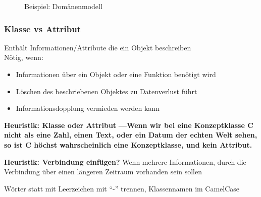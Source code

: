 \documentclass[
    ngerman,
    color=3b,
    summary,
    boxarc,
    main,
]{rubos-tuda-template}
\begin{document}
\begin{figure}[ht]
    \centering
    \caption{Beispiel: Domänenmodell}
    \label{fig:domain}
\end{figure}
\clearpage
\subsubsection{Klasse vs Attribut}
\begin{definition}
    Enthält Informationen/Attribute die ein Objekt beschreiben\\
    Nötig, wenn:\begin{itemize}
        \item Informationen über ein Objekt oder eine Funktion benötigt wird
        \item Löschen des beschriebenen Objektes zu Datenverlust führt
        \item Informationsdopplung vermieden werden kann
    \end{itemize}
\end{definition}
\begin{defBox}
    \small\textcolor{fgcolor}{\sffamily\bfseries Heuristik: Klasse oder Attribut} \space\sffamily\bfseries\color{fgcolor}---\normalfont\normalsize\space Wenn wir bei eine Konzeptklasse C nicht als eine Zahl, einen Text, oder ein Datum der echten Welt sehen, so ist C höchst wahrscheinlich eine Konzeptklasse, und kein Attribut.
\end{defBox}
\begin{defBox}
    \small\textcolor{fgcolor}{\sffamily\bfseries Heuristik: Verbindung einfügen?} Wenn mehrere Informationen, durch die Verbindung über einen längeren Zeitraum vorhanden sein sollen
\end{defBox}
\begin{definition}
    Wörter statt mit Leerzeichen mit "`-"' trennen, Klassennamen im CamelCase
\end{definition}
\end{document}
